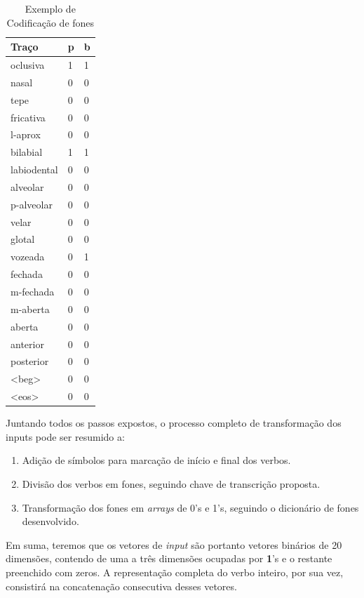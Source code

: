 \begin{table}[H]
\begin{center}
\begin{tabular}{lll}
\textbf{ Traço} & \textbf{p} &\textbf{ b} \\
 \toprule
oclusiva & 1 & 1 \\
nasal & 0 & 0 \\
tepe & 0 & 0 \\
fricativa & 0 & 0 \\
l-aprox & 0 & 0 \\
bilabial & 1 & 1 \\
labiodental & 0 & 0 \\
alveolar & 0 & 0 \\
p-alveolar & 0 & 0 \\
velar & 0 & 0 \\
glotal & 0 & 0 \\
vozeada & 0 & 1 \\
fechada & 0 & 0 \\
m-fechada & 0 & 0 \\
m-aberta & 0 & 0 \\
aberta & 0 & 0 \\
anterior & 0 & 0 \\
posterior & 0 & 0 \\
<beg> & 0 & 0 \\
<eos> & 0 & 0
\end{tabular}
\end{center}
\caption{Exemplo de Codificação de fones}
\label{tab:coding_example}
\end{table}

Juntando todos os passos expostos, o processo completo de transformação dos inputs pode ser resumido a:

\begin{enumerate}
    \item Adição de símbolos para marcação de início e final dos verbos.
    \item Divisão dos verbos em fones, seguindo chave de transcrição proposta.
    \item Transformação dos fones em \textit{arrays} de 0's e 1's, seguindo o dicionário de fones desenvolvido.
\end{enumerate}

Em suma, teremos que os vetores de \textit{input} são portanto vetores binários de 20 dimensões, contendo de uma a três dimensões ocupadas por \textbf{1}'s e o restante preenchido com zeros. A representação completa do verbo inteiro, por sua vez, consistirá na concatenação consecutiva desses vetores.






